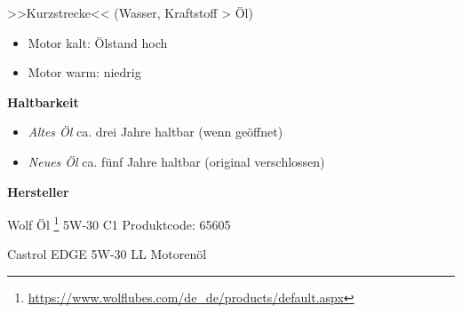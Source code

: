 >>Kurzstrecke<< (Wasser, Kraftstoff > Öl)

\begin{itemize}
\item
  Motor kalt: Ölstand hoch
\item
  Motor warm: niedrig
\end{itemize}

\textbf{Haltbarkeit}

\begin{itemize}
\item
  \emph{Altes Öl} ca. drei Jahre haltbar (wenn geöffnet)
\item
  \emph{Neues Öl} ca. fünf Jahre haltbar (original verschlossen)
\end{itemize}

\textbf{Hersteller}

Wolf Öl \footnote{\url{https://www.wolflubes.com/de_de/products/default.aspx}}
5W-30 C1 Produktcode: 65605

Castrol EDGE 5W-30 LL Motorenöl
